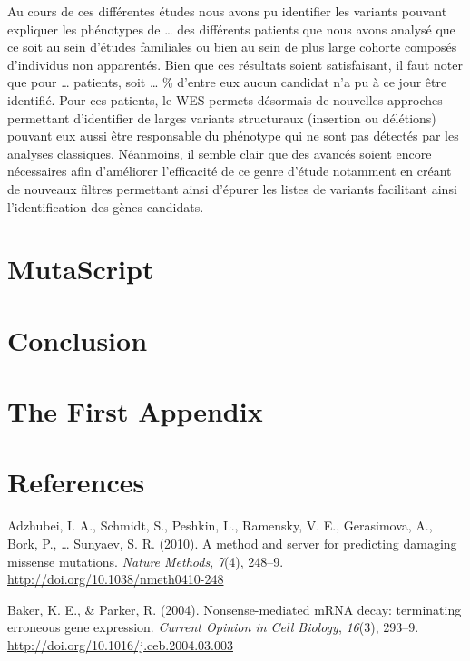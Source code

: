 \documentclass[12pt,twoside]{reedthesis}
\theoremstyle{definition}
\theoremstyle{definition}
\theoremstyle{remark}
\begin{document}
  Au cours de ces différentes études nous avons pu identifier les variants
  pouvant expliquer les phénotypes de \ldots{} des différents patients que
  nous avons analysé que ce soit au sein d'études familiales ou bien au
  sein de plus large cohorte composés d'individus non apparentés. Bien que
  ces résultats soient satisfaisant, il faut noter que pour \ldots{}
  patients, soit \ldots{} \% d'entre eux aucun candidat n'a pu à ce jour
  être identifié. Pour ces patients, le WES permets désormais de nouvelles
  approches permettant d'identifier de larges variants structuraux
  (insertion ou délétions) pouvant eux aussi être responsable du phénotype
  qui ne sont pas détectés par les analyses classiques. Néanmoins, il
  semble clair que des avancés soient encore nécessaires afin d'améliorer
  l'efficacité de ce genre d'étude notamment en créant de nouveaux filtres
  permettant ainsi d'épurer les listes de variants facilitant ainsi
  l'identification des gènes candidats.
  
  \newpage  
  
  \chapter{MutaScript}\label{mutascript}
  
  \chapter*{Conclusion}\label{conclusion-1}
  
  \chapter{The First Appendix}\label{the-first-appendix}
  
  \chapter*{References}\label{references}
  
  \hypertarget{refs}{}
  \hypertarget{ref-Adzhubei2010}{}
  Adzhubei, I. A., Schmidt, S., Peshkin, L., Ramensky, V. E., Gerasimova,
  A., Bork, P., \ldots{} Sunyaev, S. R. (2010). A method and server for
  predicting damaging missense mutations. \emph{Nature Methods},
  \emph{7}(4), 248--9. \url{http://doi.org/10.1038/nmeth0410-248}
  
  \hypertarget{ref-Baker2004}{}
  Baker, K. E., \& Parker, R. (2004). Nonsense-mediated mRNA decay:
  terminating erroneous gene expression. \emph{Current Opinion in Cell
  Biology}, \emph{16}(3), 293--9.
  \url{http://doi.org/10.1016/j.ceb.2004.03.003}
  
\end{document}
